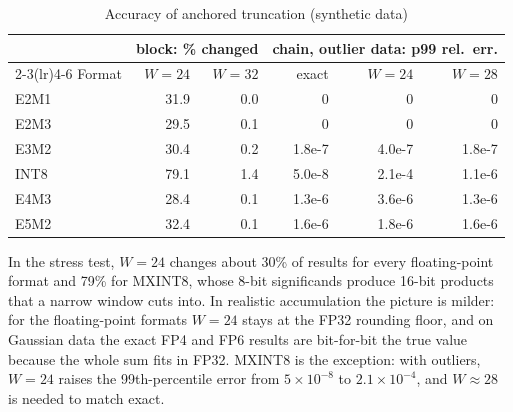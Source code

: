\documentclass[conference,compsoc]{IEEEtran}
\begin{document}
\begin{table}[t]
\centering
\caption{Accuracy of anchored truncation (synthetic data)}
\label{tab:acc}
\setlength{\tabcolsep}{3pt}
\begin{tabular}{lrrrrr}
\toprule
& \multicolumn{2}{c}{block: \% changed} & \multicolumn{3}{c}{chain, outlier data: p99 rel.\ err.} \\
\cmidrule(lr){2-3}\cmidrule(lr){4-6}
Format & $W{=}24$ & $W{=}32$ & exact & $W{=}24$ & $W{=}28$ \\
\midrule
E2M1 & 31.9 & 0.0 & 0       & 0       & 0 \\
E2M3 & 29.5 & 0.1 & 0       & 0       & 0 \\
E3M2 & 30.4 & 0.2 & 1.8e-7  & 4.0e-7  & 1.8e-7 \\
INT8 & 79.1 & 1.4 & 5.0e-8  & 2.1e-4  & 1.1e-6 \\
E4M3 & 28.4 & 0.1 & 1.3e-6  & 3.6e-6  & 1.3e-6 \\
E5M2 & 32.4 & 0.1 & 1.6e-6  & 1.8e-6  & 1.6e-6 \\
\bottomrule
\end{tabular}
\end{table}

In the stress test, $W=24$ changes about 30\% of results for every
floating-point format and 79\% for MXINT8, whose 8-bit significands produce
16-bit products that a narrow window cuts into.  In realistic accumulation
the picture is milder: for the floating-point formats $W=24$ stays at the
FP32 rounding floor, and on Gaussian data the exact FP4 and FP6 results are
bit-for-bit the true value because the whole sum fits in FP32.  MXINT8 is the exception: with
outliers, $W=24$ raises the 99th-percentile error from $5\times10^{-8}$ to
$2.1\times10^{-4}$, and $W\approx28$ is needed to match exact.
\end{document}
